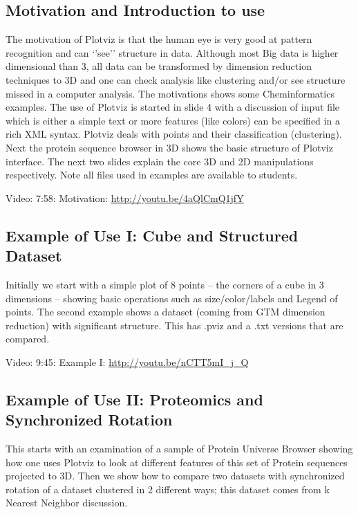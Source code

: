 \subsection{Motivation and Introduction to use}

The motivation of Plotviz is that the human eye is very good at pattern
recognition and can `'see'' structure in data. Although most Big data is
higher dimensional than 3, all data can be transformed by dimension
reduction techniques to 3D and one can check analysis like clustering
and/or see structure missed in a computer analysis. The motivations
shows some Cheminformatics examples. The use of Plotviz is started in
slide 4 with a discussion of input file which is either a simple text or
more features (like colors) can be specified in a rich XML syntax.
Plotviz deals with points and their classification (clustering). Next
the protein sequence browser in 3D shows the basic structure of Plotviz
interface. The next two slides explain the core 3D and 2D manipulations
respectively. Note all files used in examples are available to students.

Video: 7:58: Motivation: \url{http://youtu.be/4aQlCmQ1jfY}

\subsection{Example of Use I: Cube and Structured
Dataset}\label{example-of-use-i-cube-and-structured-dataset}

Initially we start with a simple plot of 8 points -- the corners of a
cube in 3 dimensions -- showing basic operations such as
size/color/labels and Legend of points. The second example shows a
dataset (coming from GTM dimension reduction) with significant
structure. This has .pviz and a .txt versions that are compared.

Video: 9:45: Example I: \url{http://youtu.be/nCTT5mI_j_Q}

\subsection{Example of Use II: Proteomics and Synchronized
Rotation}\label{example-of-use-ii-proteomics-and-synchronized-rotation}

This starts with an examination of a sample of Protein Universe Browser
showing how one uses Plotviz to look at different features of this set
of Protein sequences projected to 3D. Then we show how to compare two
datasets with synchronized rotation of a dataset clustered in 2
different ways; this dataset comes from k Nearest Neighbor discussion.

